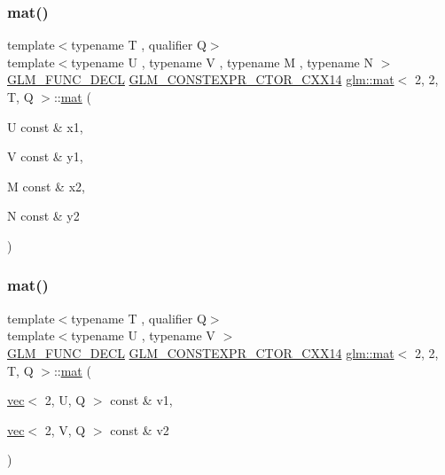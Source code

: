 \mbox{\label{structglm_1_1mat_3_012_00_012_00_01_t_00_01_q_01_4_aac74687c9f4e9b9155fb1e72bf5c5be0}} 
\subsubsection{\texorpdfstring{mat()}{mat()}\hspace{0.1cm}{\footnotesize\ttfamily [7/21]}}
{\footnotesize\ttfamily template$<$typename T , qualifier Q$>$ \\
template$<$typename U , typename V , typename M , typename N $>$ \\
\hyperlink{setup_8hpp_ab2d052de21a70539923e9bcbf6e83a51}{G\+L\+M\+\_\+\+F\+U\+N\+C\+\_\+\+D\+E\+CL} \hyperlink{setup_8hpp_a0900f9145e68bf6061b6f5e7be3fa751}{G\+L\+M\+\_\+\+C\+O\+N\+S\+T\+E\+X\+P\+R\+\_\+\+C\+T\+O\+R\+\_\+\+C\+X\+X14} \hyperlink{structglm_1_1mat}{glm\+::mat}$<$ 2, 2, T, Q $>$\+::\hyperlink{structglm_1_1mat}{mat} (\begin{DoxyParamCaption}\item[{U const \&}]{x1,  }\item[{V const \&}]{y1,  }\item[{M const \&}]{x2,  }\item[{N const \&}]{y2 }\end{DoxyParamCaption})}

\mbox{\label{structglm_1_1mat_3_012_00_012_00_01_t_00_01_q_01_4_a5bae47b291567292c6931d1fa10b5798}} 
\subsubsection{\texorpdfstring{mat()}{mat()}\hspace{0.1cm}{\footnotesize\ttfamily [8/21]}}
{\footnotesize\ttfamily template$<$typename T , qualifier Q$>$ \\
template$<$typename U , typename V $>$ \\
\hyperlink{setup_8hpp_ab2d052de21a70539923e9bcbf6e83a51}{G\+L\+M\+\_\+\+F\+U\+N\+C\+\_\+\+D\+E\+CL} \hyperlink{setup_8hpp_a0900f9145e68bf6061b6f5e7be3fa751}{G\+L\+M\+\_\+\+C\+O\+N\+S\+T\+E\+X\+P\+R\+\_\+\+C\+T\+O\+R\+\_\+\+C\+X\+X14} \hyperlink{structglm_1_1mat}{glm\+::mat}$<$ 2, 2, T, Q $>$\+::\hyperlink{structglm_1_1mat}{mat} (\begin{DoxyParamCaption}\item[{\hyperlink{structglm_1_1vec}{vec}$<$ 2, U, Q $>$ const \&}]{v1,  }\item[{\hyperlink{structglm_1_1vec}{vec}$<$ 2, V, Q $>$ const \&}]{v2 }\end{DoxyParamCaption})}

